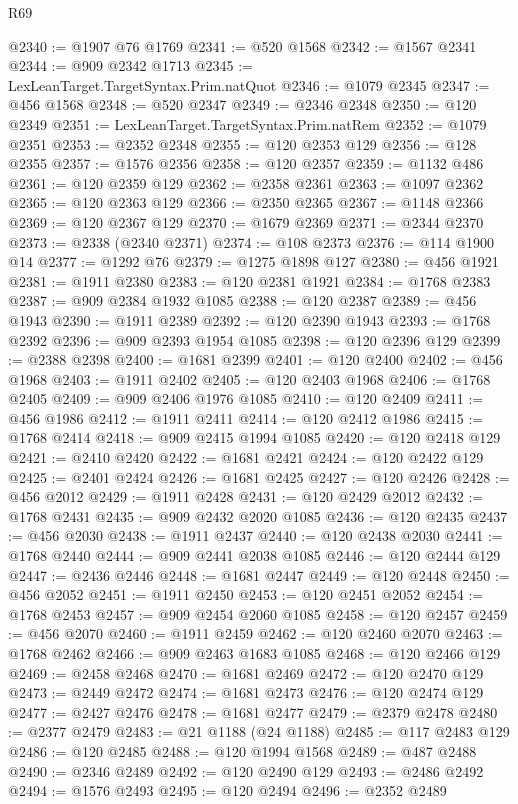 \begin{lexlean}{R69}
\begin{coremodule}
@2340 := @1907 @76 @1769
@2341 := @520 @1568
@2342 := @1567 @2341
@2344 := @909 @2342 @1713
@2345 := LexLeanTarget.TargetSyntax.Prim.natQuot
@2346 := @1079 @2345
@2347 := @456 @1568
@2348 := @520 @2347
@2349 := @2346 @2348
@2350 := @120 @2349
@2351 := LexLeanTarget.TargetSyntax.Prim.natRem
@2352 := @1079 @2351
@2353 := @2352 @2348
@2355 := @120 @2353 @129
@2356 := @128 @2355
@2357 := @1576 @2356
@2358 := @120 @2357
@2359 := @1132 @486
@2361 := @120 @2359 @129
@2362 := @2358 @2361
@2363 := @1097 @2362
@2365 := @120 @2363 @129
@2366 := @2350 @2365
@2367 := @1148 @2366
@2369 := @120 @2367 @129
@2370 := @1679 @2369
@2371 := @2344 @2370
@2373 := @2338 (@2340 @2371)
@2374 := @108 @2373
@2376 := @114 @1900 @14
@2377 := @1292 @76
@2379 := @1275 @1898 @127
@2380 := @456 @1921
@2381 := @1911 @2380
@2383 := @120 @2381 @1921
@2384 := @1768 @2383
@2387 := @909 @2384 @1932 @1085
@2388 := @120 @2387
@2389 := @456 @1943
@2390 := @1911 @2389
@2392 := @120 @2390 @1943
@2393 := @1768 @2392
@2396 := @909 @2393 @1954 @1085
@2398 := @120 @2396 @129
@2399 := @2388 @2398
@2400 := @1681 @2399
@2401 := @120 @2400
@2402 := @456 @1968
@2403 := @1911 @2402
@2405 := @120 @2403 @1968
@2406 := @1768 @2405
@2409 := @909 @2406 @1976 @1085
@2410 := @120 @2409
@2411 := @456 @1986
@2412 := @1911 @2411
@2414 := @120 @2412 @1986
@2415 := @1768 @2414
@2418 := @909 @2415 @1994 @1085
@2420 := @120 @2418 @129
@2421 := @2410 @2420
@2422 := @1681 @2421
@2424 := @120 @2422 @129
@2425 := @2401 @2424
@2426 := @1681 @2425
@2427 := @120 @2426
@2428 := @456 @2012
@2429 := @1911 @2428
@2431 := @120 @2429 @2012
@2432 := @1768 @2431
@2435 := @909 @2432 @2020 @1085
@2436 := @120 @2435
@2437 := @456 @2030
@2438 := @1911 @2437
@2440 := @120 @2438 @2030
@2441 := @1768 @2440
@2444 := @909 @2441 @2038 @1085
@2446 := @120 @2444 @129
@2447 := @2436 @2446
@2448 := @1681 @2447
@2449 := @120 @2448
@2450 := @456 @2052
@2451 := @1911 @2450
@2453 := @120 @2451 @2052
@2454 := @1768 @2453
@2457 := @909 @2454 @2060 @1085
@2458 := @120 @2457
@2459 := @456 @2070
@2460 := @1911 @2459
@2462 := @120 @2460 @2070
@2463 := @1768 @2462
@2466 := @909 @2463 @1683 @1085
@2468 := @120 @2466 @129
@2469 := @2458 @2468
@2470 := @1681 @2469
@2472 := @120 @2470 @129
@2473 := @2449 @2472
@2474 := @1681 @2473
@2476 := @120 @2474 @129
@2477 := @2427 @2476
@2478 := @1681 @2477
@2479 := @2379 @2478
@2480 := @2377 @2479
@2483 := @21 @1188 (@24 @1188)
@2485 := @117 @2483 @129
@2486 := @120 @2485
@2488 := @120 @1994 @1568
@2489 := @487 @2488
@2490 := @2346 @2489
@2492 := @120 @2490 @129
@2493 := @2486 @2492
@2494 := @1576 @2493
@2495 := @120 @2494
@2496 := @2352 @2489

\end{coremodule}
\end{lexlean}
